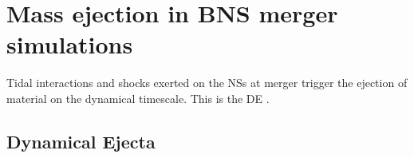
\section{Mass ejection in \ac{BNS} merger simulations}



Tidal interactions and shocks exerted on the \acp{NS} at merger 
trigger the ejection of material on the dynamical timescale. This is the \ac{DE} 
\citep[\eg][]{Hotokezaka:2013b,Bauswein:2013yna,Radice:2016dwd,Radice:2018pdn}. 



\subsection{Dynamical Ejecta} \label{sec:bns_sims:dyn}



%
%




